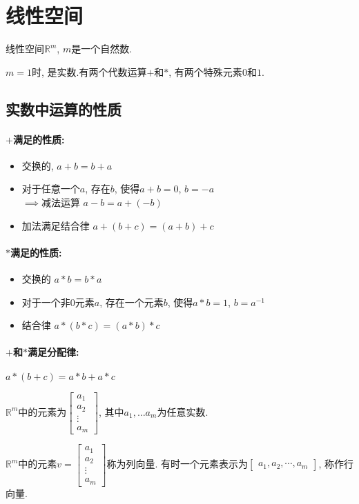 
\section{线性空间}
线性空间$\mathbb{R}^{m}$, $m$是一个自然数.

$m=1$时, 是实数.有两个代数运算$+$和$*$, 有两个特殊元素$0$和$1$.

\subsection{实数中运算的性质}

\paragraph{$+$满足的性质:}
\begin{itemize}
    \item 交换的, $a+b=b+a$
    \item 对于任意一个$a$, 存在$b$, 使得$a+b=0$, $b=-a$\\$\implies$减法运算 $a-b=a+(-b)$
    \item 加法满足结合律 $a+(b+c)=(a+b)+c$
\end{itemize}


\paragraph{$*$满足的性质:}

\begin{itemize}
    \item 交换的 $a*b = b*a$
    \item 对于一个非$0$元素$a$, 存在一个元素$b$, 使得$a*b=1$, $b=a^{-1}$
    \item 结合律 $a*(b*c)=(a*b)*c$
\end{itemize}



\paragraph{$+$和$*$满足分配律:}
$a*(b+c)=a*b+a*c$


\begin{definition}
    $\mathbb{R}^{m}$中的元素为$\begin{bmatrix} a_1 \\ a_2 \\ \vdots \\ a_m \end{bmatrix}$, 其中$a_1, \ldots a_m$为任意实数.

    $\mathbb{R}^{m}$中的元素$v=\begin{bmatrix} a_1 \\ a_2 \\ \vdots \\ a_m \end{bmatrix}$称为列向量. 有时一个元素表示为$\begin{bmatrix} a_1, a_2, \cdots, a_m \end{bmatrix}$, 称作行向量.
\end{definition}

